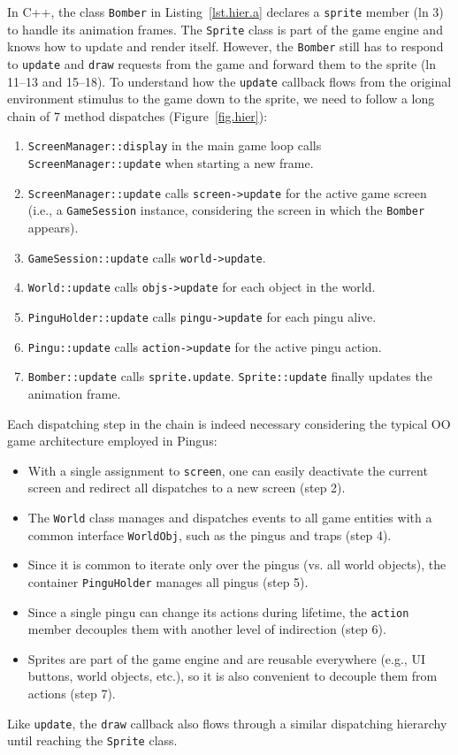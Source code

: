 \documentclass[10pt, conference, compsocconf]{IEEEtran}
\newcommand{\code}[1] {{\small{\texttt{#1}}}}
\begin{document}
In C++, the class \code{Bomber} in Listing~\ref{lst.hier.a} declares a
\code{sprite} member (ln 3) to handle its animation frames.
%
The \code{Sprite} class is part of the game engine and knows how to update and
render itself.
However, the \code{Bomber} still has to respond to \code{update} and
\code{draw} requests from the game and forward them to the sprite
(ln 11--13 and 15--18).
%
To understand how the \code{update} callback flows from the original
environment stimulus to the game down to the sprite, we need to follow a long
chain of 7 method dispatches (Figure~\ref{fig.hier}):
%
\begin{enumerate}
\item \code{ScreenManager::display} in the main game loop calls
      \code{ScreenManager::update} when starting a new frame.
\item \code{ScreenManager::update} calls \code{screen->update} for the active
      game screen (i.e., a \code{GameSession} instance, considering the screen
      in which the \code{Bomber} appears).
\item \code{GameSession::update} calls \code{world->update}.
\item \code{World::update} calls \code{objs->update} for each object in the
      world.
\item \code{PinguHolder::update} calls \code{pingu->update} for each pingu
      alive.
\item \code{Pingu::update} calls \code{action->update} for the active pingu
      action.
\item \code{Bomber::update} calls \code{sprite.update}.
      \code{Sprite::update} finally updates the animation frame.
\end{enumerate}
%
Each dispatching step in the chain is indeed necessary considering the typical
OO game architecture employed in Pingus:
%
\begin{itemize}
\item With a single assignment to \code{screen}, one can easily deactivate the
current screen and redirect all dispatches to a new screen (step 2).
\item The \code{World} class manages and dispatches events to all game
      entities with a common interface \code{WorldObj}, such as the pingus and
      traps (step 4).
\item Since it is common to iterate only over the pingus (vs. all world
      objects), the container \code{PinguHolder} manages all pingus (step 5).
\item Since a single pingu can change its actions during lifetime, the
      \code{action} member decouples them with another level of indirection
      (step 6).
\item Sprites are part of the game engine and are reusable everywhere (e.g., UI
      buttons, world objects, etc.), so it is also convenient to decouple them
      from actions (step 7).
\end{itemize}
%
Like \code{update}, the \code{draw} callback also flows through a similar
dispatching hierarchy until reaching the \code{Sprite} class.
\end{document}
